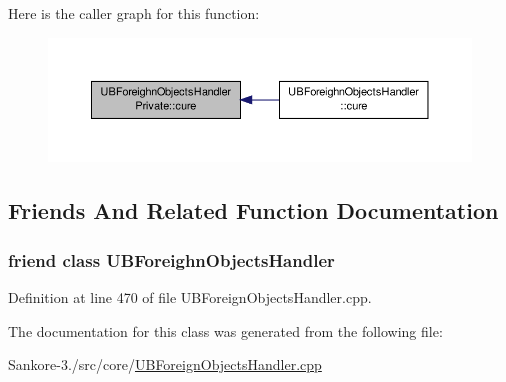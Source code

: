 Here is the caller graph for this function\-:
\nopagebreak
\begin{figure}[H]
\begin{center}
\leavevmode
\includegraphics[width=350pt]{db/d70/class_u_b_foreighn_objects_handler_private_aa747ec8e48e5b439c6e6d147868eb0e9_icgraph}
\end{center}
\end{figure}




\subsection{Friends And Related Function Documentation}
\hypertarget{class_u_b_foreighn_objects_handler_private_afcce3131bc8458c8f53279a28e7b0099}{
\subsubsection[{U\-B\-Foreighn\-Objects\-Handler}]{\setlength{\rightskip}{0pt plus 5cm}friend class {\bf U\-B\-Foreighn\-Objects\-Handler}\hspace{0.3cm}{\ttfamily [friend]}}}\label{db/d70/class_u_b_foreighn_objects_handler_private_afcce3131bc8458c8f53279a28e7b0099}


Definition at line 470 of file U\-B\-Foreign\-Objects\-Handler.\-cpp.



The documentation for this class was generated from the following file\-:\begin{DoxyCompactItemize}
\item 
Sankore-\/3./src/core/\hyperlink{_u_b_foreign_objects_handler_8cpp}{U\-B\-Foreign\-Objects\-Handler.\-cpp}\end{DoxyCompactItemize}

